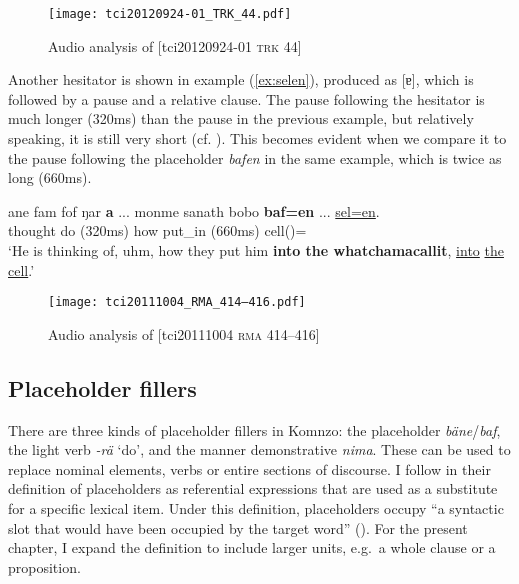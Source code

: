 \documentclass[output=paper,colorlinks,citecolor=brown]{langscibook}
\begin{document}
\begin{figure}
    \texttt{[image: tci20120924-01\_TRK\_44.pdf]}
    \caption{Audio analysis of [tci20120924-01 \textsc{trk} 44]}
    \label{fig:doehler:nomni}
\end{figure}

Another hesitator is shown in example (\ref{ex:selen}), produced as [ɐ], which is followed by a pause and a relative clause. The pause following the hesitator is much longer (320ms) than the pause in the previous example, but relatively speaking, it is still very short (cf. ). This becomes evident when we compare it to the pause following the placeholder \textit{bafen} in the same example, which is twice as long (660ms).

\ea \label{ex:selen}
    \gll ane fam fof ŋar \textbf{a} ... monme sanath bobo \textbf{baf=en} ... \uline{sel=en}.\\
     thought  do  (320ms) how put\_in   (660ms) cell()=\\
    \glt `He is thinking of, uhm, how they put him \textbf{into the whatchamacallit}, \uline{into} \uline{the cell}.' 
\z

\begin{figure}
    \texttt{[image: tci20111004\_RMA\_414–416.pdf]}
    \caption{Audio analysis of [tci20111004 \textsc{rma} 414--416]}
    \label{fig:doehler:selen}
\end{figure}

\subsection{Placeholder fillers}\label{sec:doehler:placeholdersov}

There are three kinds of placeholder fillers in Komnzo: the placeholder \textit{bäne}/\textit{baf}, the light verb \textit{-rä} `do', and the manner demonstrative \textit{nima}. These can be used to replace nominal elements, verbs or entire sections of discourse. I follow \textcite{Hayashi:2006aa} in their definition of placeholders as referential expressions that are used as a substitute for a specific lexical item. Under this definition, placeholders occupy ``a syntactic slot that would have been occupied by the target word'' (\citeyear[490]{Hayashi:2006aa}). For the present chapter, I expand the definition to include larger units, e.g.\ a whole clause or a proposition.
\end{document}
